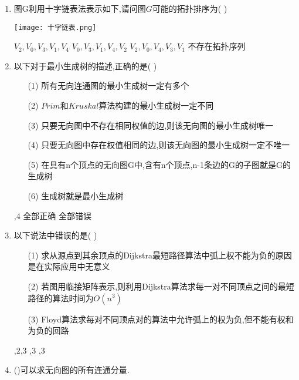 \documentclass[12pt, a4paper, oneside, UTF8]{ctexbook}
\begin{document}
\begin{enumerate}
    \item 图G利用十字链表法表示如下,请问图$G$可能的拓扑排序为(    ) 
    \begin{center}
    \texttt{[image: 十字链表.png]}
    \end{center}
    \begin{choices}
        \task $V_2,V_0,V_3,V_1,V_4$ 
        \task $V_0,V_3,V_1,V_4,V_2$ 
        \task $V_2,V_0,V_4,V_3,V_1$ 
        \task 不存在拓扑序列
    \end{choices}



    \item 以下对于最小生成树的描述,正确的是(   ) 
    \begin{enumerate}
        \item [(1)] 所有无向连通图的最小生成树一定有多个 
        \item [(2)] $Prim$和$Kruskal$算法构建的最小生成树一定不同 
        \item [(3)] 只要无向图中不存在相同权值的边,则该无向图的最小生成树唯一 
        \item [(4)] 只要无向图中存在权值相同的边,则该无向图的最小生成树一定不唯一
        \item [(5)] 在具有n个顶点的无向图G中,含有n个顶点,n-1条边的G的子图就是G的生成树 
        \item [(6)] 生成树就是最小生成树 
    \end{enumerate}
    \begin{choices}
         ,4 \task 全部正确 \task 全部错误 
    \end{choices}

    \item 以下说法中错误的是(   ) 
    \begin{enumerate}
        \item [(1)] 求从源点到其余顶点的Dijkstra最短路径算法中弧上权不能为负的原因是在实际应用中无意义 
        \item [(2)] 若图用临接矩阵表示,则利用Dijkstra算法求每一对不同顶点之间的最短路径的算法时间为$O(n^3)$ 
        \item [(3)] Floyd算法求每对不同顶点对的算法中允许弧上的权为负,但不能有权和为负的回路 
    \end{enumerate}
    \begin{choices}
        ,2,3  ,3 ,3 
    \end{choices}

    \item ()可以求无向图的所有连通分量.  



\end{enumerate}
\end{document}
